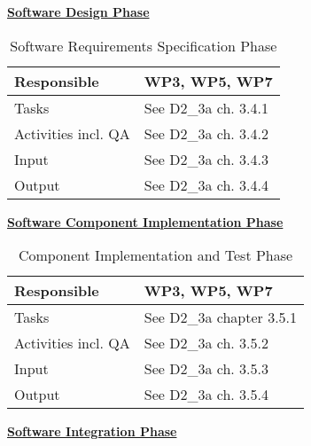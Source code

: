 \documentclass{template/openetcs_article}
\begin{document}
\underline{\textbf{Software Design Phase}}

\begin{table}[H]
	\begin{center}
		\tablehead{\\}
			
		\begin{supertabular}[H]{|p{6cm}|p{8cm}|}
			\hline
	
			Responsible &
			WP3, WP5, WP7 \\
			\hline
		
			Tasks &
			See D2\_3a ch. 3.4.1\\
			\hline
	
			Activities incl. QA &
		    See D2\_3a ch. 3.4.2\\
			\hline

			Input &
			See D2\_3a ch. 3.4.3\\
			\hline
		
			Output &
			See D2\_3a ch. 3.4.4\\ 
			\hline
					
		\end{supertabular}
	\end{center}
	\caption{Software Requirements Specification Phase}
\end{table}
\newpage
\underline{\textbf{Software Component Implementation Phase}}
\begin{table}[H]
	\begin{center}
		\tablehead{\\}
		\begin{supertabular}[H]{|p{6cm}|p{8cm}|}
			\hline

			Responsible &
			WP3, WP5, WP7 \\
			\hline

			Tasks &
			See D2\_3a chapter 3.5.1\\
			\hline

			Activities incl. QA &
			See D2\_3a ch. 3.5.2\\
			\hline
	
			Input &
			See D2\_3a ch. 3.5.3\\
			\hline

			Output &
			See D2\_3a ch. 3.5.4\\ 
			\hline
			
		\end{supertabular}
	\end{center}
	\caption{Component Implementation and Test Phase}
\end{table}
\underline{\textbf{Software Integration Phase}}
\end{document}
